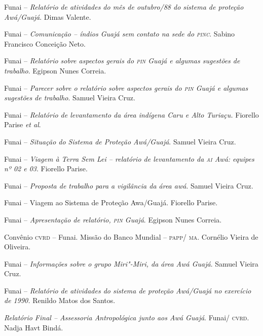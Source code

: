 \begin{itemize}
{\item[1988] Funai -- \emph{Relatório} \emph{de atividades do mês de
outubro/88 do sistema de proteção Awá/Guajá}. Dimas Valente.

\item[1988] Funai -- \emph{Comunicação -- índios Guajá sem contato na
sede do \textsc{pinc}}. Sabino Francisco Conceição Neto.

\item[1989] Funai -- \emph{Relatório sobre aspectos gerais do \textsc{pin}
Guajá e algumas sugestões de trabalho}. Egipson Nunes Correia.

\item[1989] Funai -- \emph{Parecer sobre o relatório sobre aspectos
gerais do \textsc{pin} Guajá e algumas sugestões de trabalho}. Samuel Vieira
Cruz.

\item[1989] Funai -- \emph{Relatório de levantamento da área indígena
Caru e Alto Turiaçu.} Fiorello Parise \emph{et al}.

\item[1989] Funai -- \emph{Situação do Sistema de Proteção
Awá/Guajá}. Samuel Vieira Cruz.

\item[1989] Funai -- \emph{Viagem à Terra Sem Lei -- relatório de
levantamento da \textsc{ai} Awá: equipes nº 02 e 03}. Fiorello Parise.

\item[1989] Funai -- \emph{Proposta de trabalho para a vigilância da
área awá}. Samuel Vieira Cruz.

\item[1990] Funai -- Viagem ao Sistema de Proteção Awa/Guajá.
Fiorello Parise.

\item[1990] Funai -- \emph{Apresentação de relatório, \textsc{pin} Guajá}.
Egipson Nunes Correia.

\item[1990] Convênio \textsc{cvrd} -- Funai. Missão do Banco Mundial -- \textsc{papp}/
\textsc{ma}. Cornélio Vieira de Oliveira.

\item[1990] Funai -- \emph{Informações sobre o grupo Miri"-Miri, da
área Awá Guajá}. Samuel Vieira Cruz.

\item[1990] Funai -- \emph{Relatório de atividades do sistema de
proteção Awá/Guajá no exercício de 1990.} Renildo Matos dos Santos.

\item[1999] \emph{Relatório Final -- Assessoria Antropológica junto aos
Awá Guajá}. Funai/ \textsc{cvrd}. Nadja Havt Bindá.

}
\end{itemize}
